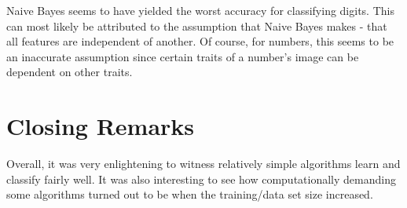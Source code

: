 \documentclass{article}
\begin{document}
Naive Bayes seems to have yielded the worst accuracy for classifying digits. This can most likely be attributed to the assumption that Naive Bayes makes - that all features are independent of another. Of course, for numbers, this seems to be an inaccurate assumption since certain traits of a number's image can be dependent on other traits. \\


\section{Closing Remarks}
Overall, it was very enlightening to witness relatively simple algorithms learn and classify fairly well. It was also interesting to see how computationally demanding some algorithms turned out to be when the training/data set size increased. 
\end{document}
